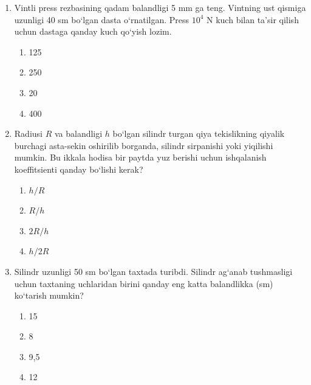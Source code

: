 \begin{enumerate}

\begin{enumerate}[label=\Alph*)]
\item 200
\item 240
\item 280
\item 300
\end{enumerate}

\item Vintli press rezbasining qadam balandligi 5 mm ga teng. Vintning ust qismiga uzunligi 40 sm bo‘lgan dasta o‘rnatilgan. Press $10^4$ N kuch bilan ta’sir qilish uchun dastaga qanday kuch qo‘yish lozim.
\begin{enumerate}[label=\Alph*)]
\item 125
\item 250
\item 20
\item 400
\end{enumerate}

\item Radiusi $R$ va balandligi $h$ bo‘lgan silindr turgan qiya tekislikning qiyalik burchagi asta-sekin oshirilib borganda, silindr sirpanishi yoki yiqilishi mumkin. Bu ikkala hodisa bir paytda yuz berishi uchun ishqalanish koeffitsienti qanday bo‘lishi kerak?
\begin{enumerate}[label=\Alph*)]
\item $h/R$
\item $R/h$
\item $2R/h$
\item $h/2R$
\end{enumerate}

\item Silindr uzunligi 50 sm bo‘lgan taxtada turibdi. Silindr ag‘anab tushmasligi uchun taxtaning uchlaridan birini qanday eng katta balandlikka (sm) ko‘tarish mumkin?
\begin{enumerate}[label=\Alph*)]
\item 15
\item 8
\item 9,5
\item 12
\end{enumerate}


\end{enumerate}
